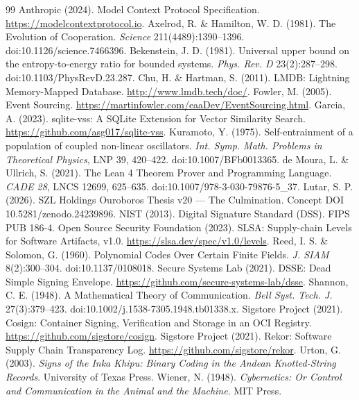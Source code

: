 \documentclass[11pt]{article}
\theoremstyle{plain}
\theoremstyle{definition}
\theoremstyle{remark}
\begin{document}
\begin{thebibliography}{99}
 Anthropic (2024). Model Context Protocol Specification. \url{https://modelcontextprotocol.io}.
 Axelrod, R. \& Hamilton, W. D. (1981). The Evolution of Cooperation. \emph{Science} 211(4489):1390--1396. doi:10.1126/science.7466396.
 Bekenstein, J. D. (1981). Universal upper bound on the entropy-to-energy ratio for bounded systems. \emph{Phys. Rev. D} 23(2):287--298. doi:10.1103/PhysRevD.23.287.
 Chu, H. \& Hartman, S. (2011). LMDB: Lightning Memory-Mapped Database. \url{http://www.lmdb.tech/doc/}.
 Fowler, M. (2005). Event Sourcing. \url{https://martinfowler.com/eaaDev/EventSourcing.html}.
 Garcia, A. (2023). sqlite-vss: A SQLite Extension for Vector Similarity Search. \url{https://github.com/asg017/sqlite-vss}.
 Kuramoto, Y. (1975). Self-entrainment of a population of coupled non-linear oscillators. \emph{Int. Symp. Math. Problems in Theoretical Physics}, LNP 39, 420--422. doi:10.1007/BFb0013365.
 de Moura, L. \& Ullrich, S. (2021). The Lean 4 Theorem Prover and Programming Language. \emph{CADE 28}, LNCS 12699, 625--635. doi:10.1007/978-3-030-79876-5\_37.
 Lutar, S. P. (2026). SZL Holdings Ouroboros Thesis v20 --- The Culmination. Concept DOI 10.5281/zenodo.24239896.
 NIST (2013). Digital Signature Standard (DSS). FIPS PUB 186-4.
 Open Source Security Foundation (2023). SLSA: Supply-chain Levels for Software Artifacts, v1.0. \url{https://slsa.dev/spec/v1.0/levels}.
 Reed, I. S. \& Solomon, G. (1960). Polynomial Codes Over Certain Finite Fields. \emph{J. SIAM} 8(2):300--304. doi:10.1137/0108018.
 Secure Systems Lab (2021). DSSE: Dead Simple Signing Envelope. \url{https://github.com/secure-systems-lab/dsse}.
 Shannon, C. E. (1948). A Mathematical Theory of Communication. \emph{Bell Syst. Tech. J.} 27(3):379--423. doi:10.1002/j.1538-7305.1948.tb01338.x.
 Sigstore Project (2021). Cosign: Container Signing, Verification and Storage in an OCI Registry. \url{https://github.com/sigstore/cosign}.
 Sigstore Project (2021). Rekor: Software Supply Chain Transparency Log. \url{https://github.com/sigstore/rekor}.
 Urton, G. (2003). \emph{Signs of the Inka Khipu: Binary Coding in the Andean Knotted-String Records}. University of Texas Press.
 Wiener, N. (1948). \emph{Cybernetics: Or Control and Communication in the Animal and the Machine}. MIT Press.
\end{thebibliography}
\end{document}

